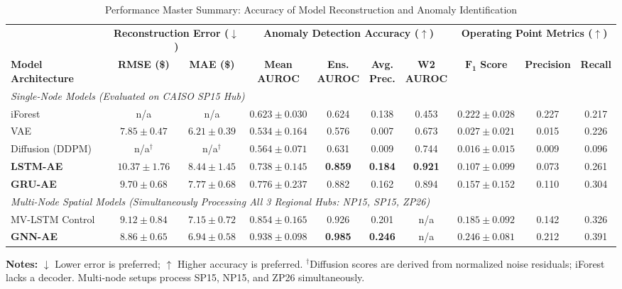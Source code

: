 \documentclass[journal]{IEEEtran}
\begin{document}
\begin{table}[!t]
\centering
\caption{Performance Master Summary: Accuracy of Model Reconstruction and Anomaly Identification}
\label{tab:detector_results}
\footnotesize
\renewcommand{\arraystretch}{1.2}
\setlength{\tabcolsep}{3.5pt}
\begin{tabular*}{\textwidth}{@{\extracolsep{\fill}}lccccccccc@{}}
\toprule
& \multicolumn{2}{c}{\textbf{Reconstruction Error ($\downarrow$)}} & \multicolumn{4}{c}{\textbf{Anomaly Detection Accuracy ($\uparrow$)}} & \multicolumn{3}{c}{\textbf{Operating Point Metrics ($\uparrow$)}} \\
\cmidrule(lr){2-3} \cmidrule(lr){4-7} \cmidrule(lr){8-10}
\textbf{Model Architecture} & \textbf{RMSE (\$)} & \textbf{MAE (\$)} & \shortstack{\textbf{Mean}\\\textbf{AUROC}} & \shortstack{\textbf{Ens.}\\\textbf{AUROC}} & \shortstack{\textbf{Avg.}\\\textbf{Prec.}} & \shortstack{\textbf{W2}\\\textbf{AUROC}} & \shortstack{$\boldsymbol{F_1}$\\\textbf{Score}} & \textbf{Precision} & \textbf{Recall} \\
\midrule
\multicolumn{10}{l}{\emph{Single-Node Models (Evaluated on CAISO SP15 Hub)}} \\
iForest & n/a & n/a & $0.623\pm0.030$ & 0.624 & 0.138 & 0.453 & $0.222\pm0.028$ & 0.227 & 0.217 \\
VAE & $7.85\pm0.47$ & $6.21\pm0.39$ & $0.534\pm0.164$ & 0.576 & 0.007 & 0.673 & $0.027\pm0.021$ & 0.015 & 0.226 \\
Diffusion (DDPM) & n/a$^\dagger$ & n/a$^\dagger$ & $0.564\pm0.071$ & 0.631 & 0.009 & 0.744 & $0.016\pm0.015$ & 0.009 & 0.096 \\
\textbf{LSTM-AE} & $10.37\pm1.76$ & $8.44\pm1.45$ & $\mathbf{0.738\pm0.145}$ & \textbf{0.859} & \textbf{0.184} & \textbf{0.921} & $0.107\pm0.099$ & 0.073 & 0.261 \\
\textbf{GRU-AE} & $9.70\pm0.68$ & $7.77\pm0.68$ & $0.776\pm0.237$ & 0.882 & 0.162 & 0.894 & $0.157\pm0.152$ & 0.110 & 0.304 \\
\midrule
\multicolumn{10}{l}{\emph{Multi-Node Spatial Models (Simultaneously Processing All 3 Regional Hubs: NP15, SP15, ZP26)}} \\
MV-LSTM Control & $9.12\pm0.84$ & $7.15\pm0.72$ & $0.854\pm0.165$ & 0.926 & 0.201 & n/a & $0.185\pm0.092$ & 0.142 & 0.326 \\
\textbf{GNN-AE} & $8.86\pm0.65$ & $6.94\pm0.58$ & $\mathbf{0.938\pm0.098}$ & \textbf{0.985} & \textbf{0.246} & n/a & $\mathbf{0.246\pm0.081}$ & 0.212 & 0.391 \\
\bottomrule
\end{tabular*}
\vspace{2pt}
{\raggedright \scriptsize \textbf{Notes:} $\downarrow$ Lower error is preferred; $\uparrow$ Higher accuracy is preferred. $^\dagger$Diffusion scores are derived from normalized noise residuals; iForest lacks a decoder. Multi-node setups process SP15, NP15, and ZP26 simultaneously.\par}
\end{table}
\end{document}
